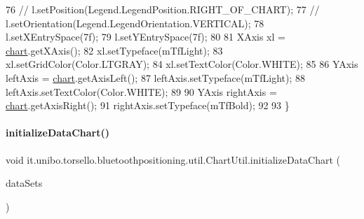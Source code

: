 \begin{DoxyCode}
76 \textcolor{comment}{//        l.setPosition(Legend.LegendPosition.RIGHT\_OF\_CHART);}
77 \textcolor{comment}{//        l.setOrientation(Legend.LegendOrientation.VERTICAL);}
78         l.setXEntrySpace(7f);
79         l.setYEntrySpace(7f);
80 
81         XAxis xl = \hyperlink{classit_1_1unibo_1_1torsello_1_1bluetoothpositioning_1_1util_1_1ChartUtil_a6c34176fdfb85bac1d3aa1529b49ad5f_a6c34176fdfb85bac1d3aa1529b49ad5f}{chart}.getXAxis();
82         xl.setTypeface(mTfLight);
83         xl.setGridColor(Color.LTGRAY);
84         xl.setTextColor(Color.WHITE);
85 
86         YAxis leftAxis = \hyperlink{classit_1_1unibo_1_1torsello_1_1bluetoothpositioning_1_1util_1_1ChartUtil_a6c34176fdfb85bac1d3aa1529b49ad5f_a6c34176fdfb85bac1d3aa1529b49ad5f}{chart}.getAxisLeft();
87         leftAxis.setTypeface(mTfLight);
88         leftAxis.setTextColor(Color.WHITE);
89 
90         YAxis rightAxis = \hyperlink{classit_1_1unibo_1_1torsello_1_1bluetoothpositioning_1_1util_1_1ChartUtil_a6c34176fdfb85bac1d3aa1529b49ad5f_a6c34176fdfb85bac1d3aa1529b49ad5f}{chart}.getAxisRight();
91         rightAxis.setTypeface(mTfBold);
92 
93     \}
\end{DoxyCode}
\hypertarget{classit_1_1unibo_1_1torsello_1_1bluetoothpositioning_1_1util_1_1ChartUtil_a3393d9aa353849188c02a63d64f2dd2d_a3393d9aa353849188c02a63d64f2dd2d}{}\label{classit_1_1unibo_1_1torsello_1_1bluetoothpositioning_1_1util_1_1ChartUtil_a3393d9aa353849188c02a63d64f2dd2d_a3393d9aa353849188c02a63d64f2dd2d} 
\paragraph{\texorpdfstring{initialize\+Data\+Chart()}{initializeDataChart()}}
{\footnotesize\ttfamily void it.\+unibo.\+torsello.\+bluetoothpositioning.\+util.\+Chart\+Util.\+initialize\+Data\+Chart (\begin{DoxyParamCaption}\item[{Array\+List$<$ I\+Line\+Data\+Set $>$}]{data\+Sets }\end{DoxyParamCaption})\hspace{0.3cm}{\ttfamily [private]}}


